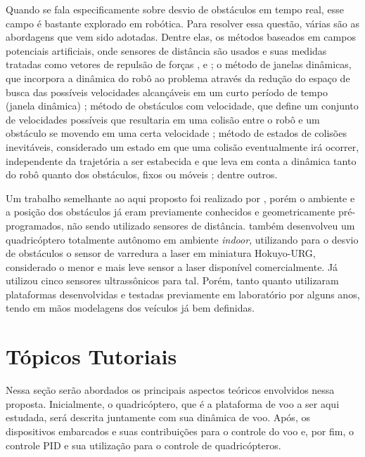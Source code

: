 \documentclass[a4paper, 12pt]{article}
\begin{document}
Quando se fala especificamente sobre desvio de obstáculos em tempo real, esse campo é bastante explorado em robótica. Para resolver essa questão, várias são as abordagens que vem sido adotadas. Dentre elas, os métodos baseados em campos potenciais artificiais,  onde sensores de distância são usados e suas medidas tratadas como vetores de repulsão de forças \cite{Bouktir2008}, \cite{Nieuwenhuisen2013} e \cite{Borenstein1989}; o método de janelas dinâmicas, que incorpora a dinâmica do robô ao problema através da redução do espaço de busca das possíveis velocidades alcançáveis em um curto período de tempo (janela dinâmica) \cite{Fox1997} \cite{Saranrittichai2013}; método de obstáculos com velocidade, que define um conjunto de velocidades possíveis que resultaria em uma colisão entre o robô e um obstáculo se movendo em uma certa velocidade \cite{Fiorini1998} \cite{Claes2012} \cite{Berg2012}; método de estados de colisões inevitáveis, considerado um estado em que uma colisão eventualmente irá ocorrer, independente da trajetória a ser estabecida e que leva em conta a dinâmica tanto do robô quanto dos obstáculos, fixos ou móveis \cite{Fraichard2004}; dentre outros.   

Um trabalho semelhante ao aqui proposto foi realizado por \cite{Israelsen}, porém o ambiente e a posição dos obstáculos já eram previamente conhecidos e geometricamente pré-programados, não sendo utilizado sensores de distância. \cite{Grzonka2012} também desenvolveu um quadricóptero totalmente autônomo em ambiente \textit{indoor}, utilizando para o desvio de obstáculos o sensor de varredura a laser em miniatura Hokuyo-URG, considerado o menor e mais leve sensor a laser disponível comercialmente. Já \cite{Becker2012} utilizou cinco sensores ultrassônicos para tal. Porém, tanto \cite{Grzonka2012} quanto \cite{Becker2012} utilizaram plataformas desenvolvidas e testadas previamente em laboratório por alguns anos, tendo em mãos modelagens dos veículos já bem definidas.



\newpage

\section{Tópicos Tutoriais}
\label{sec:tutoriais}

Nessa seção serão abordados os principais aspectos teóricos envolvidos nessa proposta. Inicialmente, 
o quadricóptero, que é a plataforma de voo a ser aqui estudada, será descrita juntamente com sua dinâmica de voo. Após, os dispositivos embarcados e suas contribuições para o controle do voo e, por fim, o controle PID e sua utilização para o controle de quadricópteros.
\end{document}
